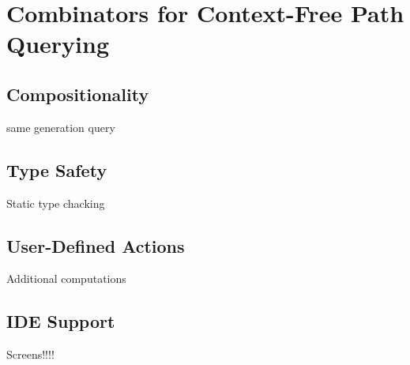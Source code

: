 \section{Combinators for Context-Free Path Querying}

\subsection{Compositionality}

same generation query

\subsection{Type Safety}

Static type chacking

\subsection{User-Defined Actions}

Additional computations

\subsection{IDE Support}

Screens!!!!

